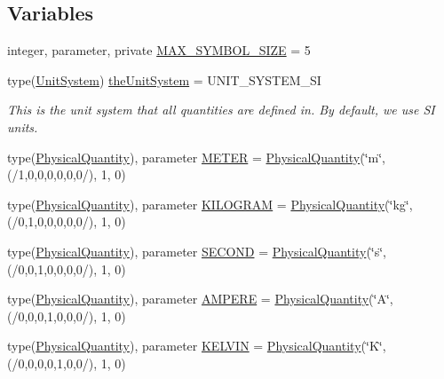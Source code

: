 \subsection*{Variables}
\begin{DoxyCompactItemize}
\item 
integer, parameter, private \hyperlink{namespaceclass__PhysicalQuantity_a2870256032bca15f690a32ce1d1b6c52}{MAX\_\-SYMBOL\_\-SIZE} = 5
\item 
type(\hyperlink{typeclass__UnitSystem_1_1UnitSystem}{UnitSystem}) \hyperlink{namespaceclass__PhysicalQuantity_a61173098b2362361938556f5fb35431e}{theUnitSystem} = UNIT\_\-SYSTEM\_\-SI
\begin{DoxyCompactList}\small\item\em This is the unit system that all quantities are defined in. By default, we use SI units. \item\end{DoxyCompactList}\item 
type(\hyperlink{typeclass__PhysicalQuantity_1_1PhysicalQuantity}{PhysicalQuantity}), parameter \hyperlink{namespaceclass__PhysicalQuantity_a0633cd9b4645d04d7d47dbd151837757}{METER} = \hyperlink{typeclass__PhysicalQuantity_1_1PhysicalQuantity}{PhysicalQuantity}(\char`\"{}m\char`\"{}, (/1,0,0,0,0,0,0/), 1, 0)
\item 
type(\hyperlink{typeclass__PhysicalQuantity_1_1PhysicalQuantity}{PhysicalQuantity}), parameter \hyperlink{namespaceclass__PhysicalQuantity_a902db03da895ab4c528d71d99e8549b0}{KILOGRAM} = \hyperlink{typeclass__PhysicalQuantity_1_1PhysicalQuantity}{PhysicalQuantity}(\char`\"{}kg\char`\"{}, (/0,1,0,0,0,0,0/), 1, 0)
\item 
type(\hyperlink{typeclass__PhysicalQuantity_1_1PhysicalQuantity}{PhysicalQuantity}), parameter \hyperlink{namespaceclass__PhysicalQuantity_a7fdf486aace5a1e99af5a634719bb9ce}{SECOND} = \hyperlink{typeclass__PhysicalQuantity_1_1PhysicalQuantity}{PhysicalQuantity}(\char`\"{}s\char`\"{}, (/0,0,1,0,0,0,0/), 1, 0)
\item 
type(\hyperlink{typeclass__PhysicalQuantity_1_1PhysicalQuantity}{PhysicalQuantity}), parameter \hyperlink{namespaceclass__PhysicalQuantity_a9672ba1ed56d49205a831ba235421de8}{AMPERE} = \hyperlink{typeclass__PhysicalQuantity_1_1PhysicalQuantity}{PhysicalQuantity}(\char`\"{}A\char`\"{}, (/0,0,0,1,0,0,0/), 1, 0)
\item 
type(\hyperlink{typeclass__PhysicalQuantity_1_1PhysicalQuantity}{PhysicalQuantity}), parameter \hyperlink{namespaceclass__PhysicalQuantity_a2fd77862111da187e89aaf75383baa00}{KELVIN} = \hyperlink{typeclass__PhysicalQuantity_1_1PhysicalQuantity}{PhysicalQuantity}(\char`\"{}K\char`\"{}, (/0,0,0,0,1,0,0/), 1, 0)

\end{DoxyCompactItemize}
